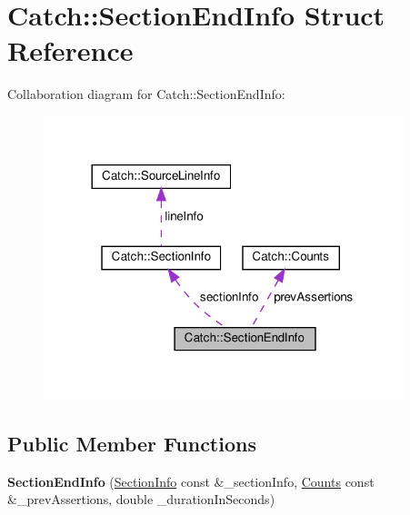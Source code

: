 \hypertarget{structCatch_1_1SectionEndInfo}{}\section{Catch\+:\+:Section\+End\+Info Struct Reference}
\label{structCatch_1_1SectionEndInfo}


Collaboration diagram for Catch\+:\+:Section\+End\+Info\+:\nopagebreak
\begin{figure}[H]
\begin{center}
\leavevmode
\includegraphics[width=296pt]{structCatch_1_1SectionEndInfo__coll__graph}
\end{center}
\end{figure}
\subsection*{Public Member Functions}
\begin{DoxyCompactItemize}
\item 
\mbox{\label{structCatch_1_1SectionEndInfo_abc9381c7c22b6907317ec985ccaa6713}} 
{\bfseries Section\+End\+Info} (\hyperlink{structCatch_1_1SectionInfo}{Section\+Info} const \&\+\_\+section\+Info, \hyperlink{structCatch_1_1Counts}{Counts} const \&\+\_\+prev\+Assertions, double \+\_\+duration\+In\+Seconds)
\end{DoxyCompactItemize}
